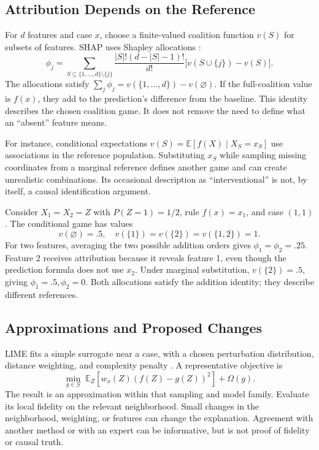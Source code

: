 \subsection{Attribution Depends on the Reference}

For $d$ features and case $x$, choose a finite-valued coalition function $v(S)$ for subsets of features. SHAP uses Shapley allocations \citep{lundberg2017shap}:
\[
\phi_j=\sum_{S\subseteq\{1,\ldots,d\}\setminus\{j\}}
\frac{|S|!(d-|S|-1)!}{d!}
\bigl[v(S\cup\{j\})-v(S)\bigr].
\]
The allocations satisfy $\sum_j\phi_j=v(\{1,\ldots,d\})-v(\varnothing)$. If the full-coalition value is $f(x)$, they add to the prediction's difference from the baseline. This identity describes the chosen coalition game. It does not remove the need to define what an ``absent'' feature means.

For instance, conditional expectations $v(S)=\mathbb E[f(X)\mid X_S=x_S]$ use associations in the reference population. Substituting $x_S$ while sampling missing coordinates from a marginal reference defines another game and can create unrealistic combinations. Its occasional description as ``interventional'' is not, by itself, a causal identification argument.

Consider $X_1=X_2=Z$ with $P(Z=1)=1/2$, rule $f(x)=x_1$, and case $(1,1)$. The conditional game has values
\[
v(\varnothing)=.5,\quad v(\{1\})=v(\{2\})=v(\{1,2\})=1.
\]
For two features, averaging the two possible addition orders gives $\phi_1=\phi_2=.25$. Feature 2 receives attribution because it reveals feature 1, even though the prediction formula does not use $x_2$. Under marginal substitution, $v(\{2\})=.5$, giving $\phi_1=.5,\phi_2=0$. Both allocations satisfy the addition identity; they describe different references.

\subsection{Approximations and Proposed Changes}

LIME fits a simple surrogate near a case, with a chosen perturbation distribution, distance weighting, and complexity penalty \citep{ribeiro2016lime}. A representative objective is
\[
\min_{g\in\mathcal G}\;
\mathbb E_Z[w_x(Z)(f(Z)-g(Z))^2]+\Omega(g).
\]
The result is an approximation within that sampling and model family. Evaluate its local fidelity on the relevant neighborhood. Small changes in the neighborhood, weighting, or features can change the explanation. Agreement with another method or with an expert can be informative, but is not proof of fidelity or causal truth.

